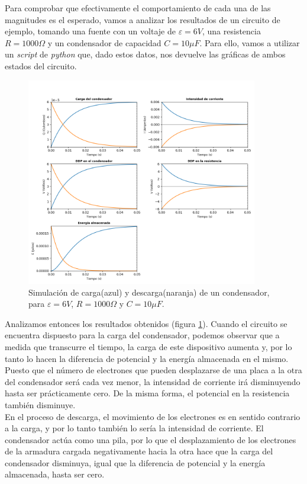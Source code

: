\documentclass[../main.tex]{subfiles}
\begin{document}
Para comprobar que efectivamente el comportamiento de cada una de las magnitudes es el esperado, vamos a analizar los resultados de un circuito de ejemplo, tomando una fuente con un voltaje de $\varepsilon = 6V$, una resistencia $R=1000\Omega$ y un condensador de capacidad $C=10 \mu F$. Para ello, vamos a utilizar un \textit{script} de \textit{python} que, dado estos datos, nos devuelve las gráficas de ambos estados del circuito.

\begin{figure}[h!]
    \centering
    \includegraphics[width=0.9\textwidth]{images/resultados_ejemplo_circuitoRC.png}
    \caption{Simulación de carga(azul) y descarga(naranja) de un condensador, para $\varepsilon=6V$, $R=1000 \Omega$ y $C=10 \mu F$.}
    \label{fig::sim_ejemplo_rc}
\end{figure}

\newpage
Analizamos entonces los resultados obtenidos (figura \ref{fig::sim_ejemplo_rc}). Cuando el circuito se encuentra dispuesto para la carga del condensador, podemos observar que a medida que transcurre el tiempo, la carga de este dispositivo aumenta y, por lo tanto lo hacen la diferencia de potencial y la energía almacenada en el mismo. Puesto que el número de electrones que pueden desplazarse de una placa a la otra del condensador será cada vez menor, la intensidad de corriente irá disminuyendo hasta ser prácticamente cero. De la misma forma, el potencial en la resistencia también disminuye.\\ 

En el proceso de descarga, el movimiento de los electrones es en sentido contrario a la carga, y por lo tanto también lo sería la intensidad de corriente. El condensador actúa como una pila, por lo que el desplazamiento de los electrones de la armadura cargada negativamente hacia la otra hace que la carga del condensador disminuya, igual que la diferencia de potencial y la energía almacenada, hasta ser cero.\\
\end{document}
